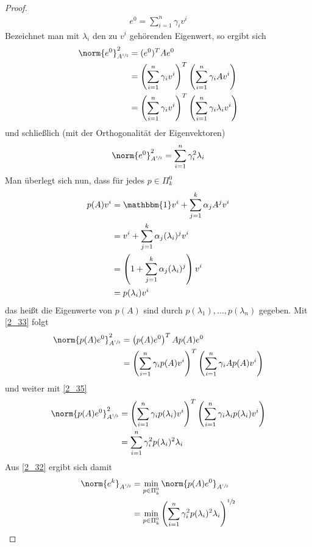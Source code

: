 \begin{proof}
\begin{align}
		\label{2_33}
		e^0 = \sum_{i=1}^n \gamma_iv^i
	\end{align}
	Bezeichnet man mit $\lambda_i$ den zu $v^i$ gehörenden Eigenwert, so ergibt sich
	\begin{align}
		\norm{e^0}^2_{A^{\sfrac{1}{2}}} &= (e^0)^TAe^0 \notag \\
		&= \left(\sum_{i=1}^n \gamma_iv^i\right)^T\left(\sum_{i=1}^n\gamma_iAv^i\right) \notag \\
		&= \left(\sum_{i=1}^n \gamma_iv^i\right)^T\left(\sum_{i=1}^n\gamma_i\lambda_iv^i\right) \notag
	\end{align}
	und schließlich (mit der Orthogonalität der Eigenvektoren)
	\begin{align}
		\label{2_34}
		\norm{e^0}^2_{A^{\sfrac{1}{2}}} = \sum_{i=1}^n\gamma_i^2\lambda_i
	\end{align}
	Man überlegt sich nun, dass für jedes $p\in\Pi_k^0$
	\begin{align}
		\label{2_35}
		\begin{split}
			p(A)v^i &= \mathbbm{1}v^i + \sum_{j=1}^k\alpha_jA^jv^i  \\
			&= v^i + \sum_{j=1}^k\alpha_j(\lambda_i)^jv^i  \\
			&= \left(1+\sum_{j=1}^k\alpha_j(\lambda_i)^j\right)v^i  \\
			&= p(\lambda_i)v^i 
		\end{split}
	\end{align}
	das heißt die Eigenwerte von $p(A)$ sind durch $p(\lambda_1),...,p(\lambda_n)$ gegeben. Mit \cref{2_33} folgt
	\begin{align}
		\norm{p(A)e^0}^2_{A^{\sfrac{1}{2}}} &= \left(p(A)e^0\right)^TAp(A)e^0 \notag \\
		&= \left(\sum_{i=1}^n \gamma_ip(A)v^i\right)^T\left(\sum_{i=1}^n\gamma_iAp(A)v^i\right)\notag
	\end{align}
	und weiter mit \cref{2_35}
	\begin{align}
		\norm{p(A)e^0}^2_{A^{\sfrac{1}{2}}} &= \left(\sum_{i=1}^n\gamma_ip(\lambda_i)v^i\right)^T \left(\sum_{i=1}^n\gamma_i\lambda_ip(\lambda_i)v^i\right) \notag \\
		&= \sum_{i=1}^n \gamma_i^2p(\lambda_i)^2\lambda_i \notag
	\end{align}
	Aus \cref{2_32} ergibt sich damit
	\begin{align}
		\norm{e^k}_{A^{\sfrac{1}{2}}} &= \min_{p\in\Pi^0_k}\norm{p(A)e^0}_{A^{\sfrac{1}{2}}} \notag \\
		&= \min_{p\in\Pi^0_k}\left(\sum_{i=1}^n\gamma_i^2p(\lambda_i)^2\lambda_i\right)^{\sfrac{1}{2}} \notag

\end{align}
\end{proof}

